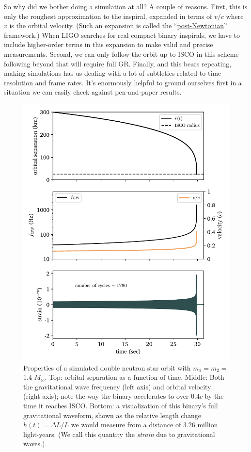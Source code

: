 \documentclass[11pt]{article}
\begin{document}
\begin{enumerate}
\hspace{15pt} So why did we bother doing a simulation at all? A couple of reasons. First, this is only the roughest approximation to the inspiral, expanded in terms of $v/c$ where $v$ is the orbital velocity. (Such an expansion is called the ``\href{https://en.wikipedia.org/wiki/Post-Newtonian_expansion}{post-Newtonian}'' framework.) When LIGO searches for real compact binary inspirals, we have to include higher-order terms in this expansion to make valid and precise measurements. Second, we can only follow the orbit up to ISCO in this scheme -- following beyond that will require full GR. Finally, and this bears repeating, making simulations has us dealing with a lot of subtleties related to time resolution and frame rates. It's enormously helpful to ground ourselves first in a situation we can easily check against pen-and-paper results.

\begin{figure}[!h]
\centering
\includegraphics[scale=1]{inspiral/inspiral_orbit_parameters.pdf}
\caption{\label{fig:orbit_parameters} Properties of a simulated double neutron star orbit with $m_1=m_2=$ 1.4 $M_{\odot}$. Top: orbital separation as a function of time. Middle: Both the gravitational wave frequency (left axis) and orbital velocity (right axis); note the way the binary accelerates to over 0.4$c$ by the time it reaches ISCO. Bottom: a visualization of this binary's full gravitational waveform, shown as the relative length change $h(t) = \Delta L/L$ we would measure from a distance of 3.26 million light-years. (We call this quantity the \textit{strain} due to gravitational waves.)}
\end{figure}


\end{enumerate}
\end{document}
